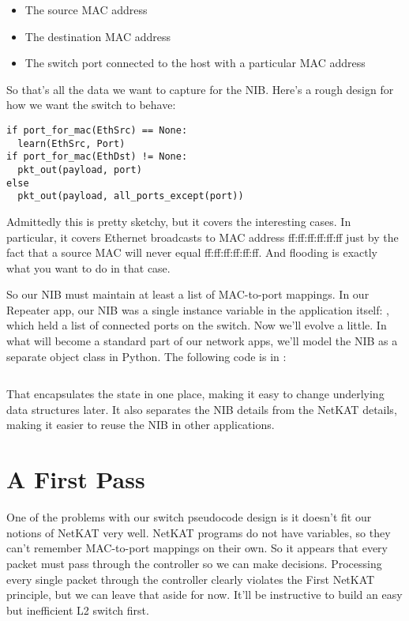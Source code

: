 \begin{itemize}
\item The source MAC address
\item The destination MAC address
\item The switch port connected to the host with a particular MAC address
\end{itemize}

So that's all the data we want to capture for the NIB.  Here's a rough design for how we want the switch to behave:

\begin{verbatim}
if port_for_mac(EthSrc) == None:
  learn(EthSrc, Port)
if port_for_mac(EthDst) != None:
  pkt_out(payload, port)
else
  pkt_out(payload, all_ports_except(port))
\end{verbatim}

Admittedly this is pretty sketchy, but it covers the interesting cases.  In particular, it covers
Ethernet broadcasts to MAC address ff:ff:ff:ff:ff:ff just by the fact that a source MAC will never
equal ff:ff:ff:ff:ff:ff.  And flooding is exactly what you want to do in that case.

So our NIB must maintain at least a list of MAC-to-port mappings.  
In our Repeater app, our NIB was a single instance variable in the application itself:
, which held a list of connected ports on the switch.  
Now we'll evolve a little.
In what will become a standard
part of our network apps, we'll model the NIB as a separate object class in Python.  
The following code is in :

\inputminted{python}{code/l2_learning_switch/network_information_base.py}

That 
encapsulates the state in one place, making it easy to change underlying data structures later.
It also separates the NIB details from the NetKAT details, making it easier to reuse the NIB
in other applications.  

\section{A First Pass}

One of the problems with our switch pseudocode design is it doesn't fit our notions of NetKAT very well.
NetKAT programs do not have variables, so they can't remember MAC-to-port mappings on their own.
So it appears that every packet must pass through the controller so we can make decisions.
Processing every single packet through the controller clearly violates the First NetKAT principle, but
we can leave that aside for now.  It'll be instructive to build an easy but inefficient L2 switch first.

